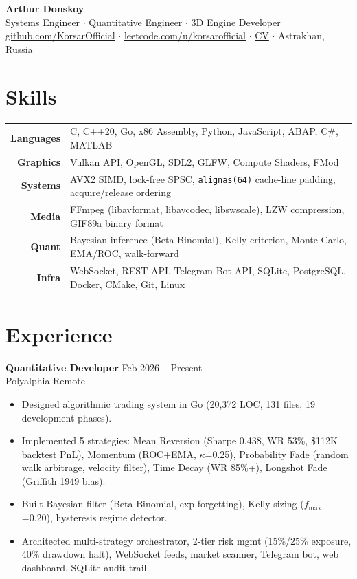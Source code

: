 \documentclass[10pt, a4paper]{article}
\newcommand{\entry}[4]{{\textbf{#1}} \hfill {\small\color{graytext}#2}\\{\small #3 \hfill #4}\vspace{2pt}}
\begin{document}
\begin{center}
{\LARGE\bfseries Arthur Donskoy}\\[2pt]
{\normalsize Systems Engineer $\cdot$ Quantitative Engineer $\cdot$ 3D Engine Developer}\\[3pt]
{\small
\href{https://github.com/KorsarOfficial}{github.com/KorsarOfficial} $\cdot$
\href{https://leetcode.com/u/korsarofficial}{leetcode.com/u/korsarofficial} $\cdot$
\href{https://github.com/KorsarOfficial/cv/blob/main/cv_en.pdf}{CV} $\cdot$
Astrakhan, Russia
}
\end{center}

\vspace{-2pt}

\section{Skills}

\begin{tabularx}{\textwidth}{@{}r|X@{}}
\textbf{\small Languages} & C, C++20, Go, x86 Assembly, Python, JavaScript, ABAP, C\#, MATLAB \\
\textbf{\small Graphics} & Vulkan API, OpenGL, SDL2, GLFW, Compute Shaders, FMod \\
\textbf{\small Systems} & AVX2 SIMD, lock-free SPSC, \texttt{alignas(64)} cache-line padding, acquire/release ordering \\
\textbf{\small Media} & FFmpeg (libavformat, libavcodec, libswscale), LZW compression, GIF89a binary format \\
\textbf{\small Quant} & Bayesian inference (Beta-Binomial), Kelly criterion, Monte Carlo, EMA/ROC, walk-forward \\
\textbf{\small Infra} & WebSocket, REST API, Telegram Bot API, SQLite, PostgreSQL, Docker, CMake, Git, Linux \\
\end{tabularx}

\vspace{-2pt}

\section{Experience}

\entry{Quantitative Developer}{Feb 2026 -- Present}{Polyalphia}{Remote}
\begin{itemize}
\item Designed algorithmic trading system in Go (20,372 LOC, 131 files, 19 development phases).
\item Implemented 5 strategies: Mean Reversion (Sharpe 0.438, WR 53\%, \$112K backtest PnL), Momentum (ROC+EMA, $\kappa$=0.25), Probability Fade (random walk arbitrage, velocity filter), Time Decay (WR 85\%+), Longshot Fade (Griffith 1949 bias).
\item Built Bayesian filter (Beta-Binomial, exp forgetting), Kelly sizing ($f_{\max}$=0.20), hysteresis regime detector.
\item Architected multi-strategy orchestrator, 2-tier risk mgmt (15\%/25\% exposure, 40\% drawdown halt), WebSocket feeds, market scanner, Telegram bot, web dashboard, SQLite audit trail.
\end{itemize}
\end{document}
